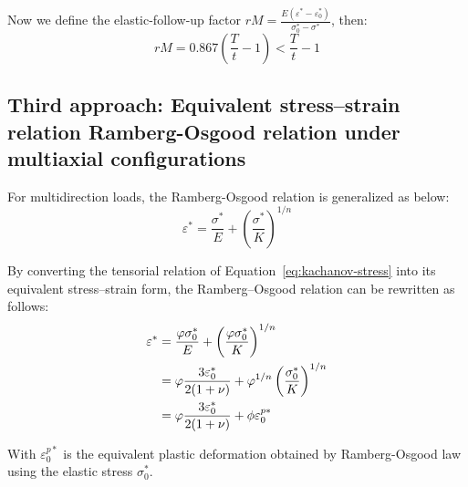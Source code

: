 \documentclass[10pt,a4paper]{article}
\begin{document}
Now we define the elastic-follow-up factor $rM=\frac{E(\varepsilon^* - \varepsilon_0^*)}{ \sigma_0^*-\sigma^* }  $, then:
	\begin{equation}
		rM    =0.867\left( \frac{T}{t} -1      \right) < \frac{T}{t} -1
		\label{def:EFU-2nd}
	\end{equation}



\newpage
\subsection{Third approach: Equivalent stress--strain relation Ramberg-Osgood relation under multiaxial configurations}
\label{sec:thirdApproach}





For multidirection loads, the Ramberg-Osgood relation is generalized as below:
\begin{equation}
\varepsilon^* = \frac{\sigma^*}{E}   + \left(\frac{\sigma^*}{K}\right)^{1/n}
\label{eq:Osgood}
\end{equation}



By converting the tensorial relation of Equation~\ref{eq:kachanov-stress} into its equivalent stress--strain form, the Ramberg--Osgood relation can be rewritten as follows:
\begin{align} 
\varepsilon^* &= \frac{\varphi \sigma_0^*}{E} + \left(\frac{\varphi \sigma_0^*}{K}\right)^{1/n} \notag \\
&= \varphi \frac{3\varepsilon_0^*}{2(1+\nu)} + \varphi^{1/n} \left(\frac{\sigma_0^*}{K}\right)^{1/n} \notag \\
&= \varphi \frac{3\varepsilon_0^*}{2(1+\nu)}  + \phi \varepsilon_0^{p*} 
\label{eq:Osgood_modified}
\end{align}

With $\varepsilon_0^{p*} $ is the equivalent plastic deformation obtained by Ramberg-Osgood law using the elastic stress $\sigma_0^*$. \\
\end{document}
